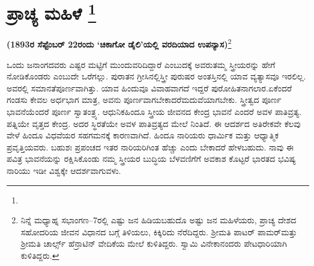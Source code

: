 
\chapter[ಪ್ರಾಚ್ಯ ಮಹಿಳೆ ]{ಪ್ರಾಚ್ಯ ಮಹಿಳೆ \protect\footnote{}}

\centerline{\textbf{(1893ರ ಸೆಪ್ಟೆಂಬರ್​ 22ರಂದು ‘ಚಿಕಾಗೋ ಡೈಲಿ’ಯಲ್ಲಿ ವರದಿಯಾದ ಉಪನ್ಯಾಸ)}\footnote{ ನಿನ್ನೆ ಮಧ್ಯಾಹ್ನ ಸಭಾಂಗಣ–7ರಲ್ಲಿ ಎಷ್ಟು ಜನ ಹಿಡಿಯಬಹುದೊ ಅಷ್ಟು ಜನ ಮಹಿಳೆಯರು, ಪ್ರಾಚ್ಯ ದೇಶದ ಸಹೋದರಿಯ ಜೀವನ ವಿಧಾನದ ಬಗ್ಗೆ ತಿಳಿಯಲು, ಕಿಕ್ಕಿರಿದು ನೆರೆದಿದ್ದರು. ಶ‍್ರೀಮತಿ ಪಾಟರ್​ ಪಾಮರ್​ ಮತ್ತು ಶ‍್ರೀಮತಿ ಚಾರ್ಲ್ಸ್​ ಹೆನ್ರಾಟಿನ್​ ವೇದಿಕೆಯ ಮೇಲೆ ಕುಳಿತಿದ್ದರು. ಸ್ವಾಮಿ ವಿನೇಕಾನಂದರು ಪೇಟಧಾರಿಯಾಗಿ ಕುಳಿತಿದ್ದರು.}}

ಒಂದು ಜನಾಂಗದವರು ಎಷ್ಟರ ಮಟ್ಟಿಗೆ ಮುಂದುವರಿದಿದ್ದಾರೆ ಎಂಬುದಕ್ಕೆ ಅವರು\break ತಮ್ಮ ಸ್ತ್ರೀಯರನ್ನು ಹೇಗೆ ನೋಡಿಕೊಂಡರು ಎಂಬುದೇ ಒರೆಗಲ್ಲು. ಪುರಾತನ ಗ್ರೀಸಿನಲ್ಲಿ\break ಸ್ತ್ರೀ ಪುರುಷರ ಅಂತಸ್ತಿನಲ್ಲಿ ಯಾವ ವ್ಯತ್ಯಾಸವೂ ಇರಲಿಲ್ಲ. ಅವರಲ್ಲಿ ಸಮಾನತೆ\break ಪೂರ್ಣವಾಗಿತ್ತು. ಯಾವ ಹಿಂದುವೂ ವಿವಾಹವಾಗದೆ ಇದ್ದರೆ ಪುರೋಹಿತನಾಗಲಾರ.\break ಏಕೆಂದರೆ ಗಂಡಸು ಕೇವಲ ಅರ್ಧಭಾಗ ಮಾತ್ರ, ಅವನು ಪೂರ್ಣವಾಗಬೇಕಾದರೆ\break ಮದುವೆಯಾಗಬೇಕು. ಸ್ತ್ರೀತ್ವದ ಪೂರ್ಣ ಭಾವನೆಯೆಂದರೆ ಪೂರ್ಣ ಸ್ವಾತಂತ್ರ್ಯ. ಆಧುನಿಕ\break ಹಿಂದೂ ಸ್ತ್ರೀಯ ಜೀವನದ ಕೇಂದ್ರ ಭಾವನೆ ಎಂದರೆ ಅವಳ ಪಾತಿವ್ರತ್ಯ. ಪತ್ನಿಯೇ ವೃತ್ತದ ಕೇಂದ್ರ. ಅದರ ಸ್ಥಿರತೆಯೇ ಅವಳ ಪಾತಿವ್ರತ್ಯದ ಮೇಲೆ ನಿಂತಿದೆ. ಈ ಆದರ್ಶದ ಅತಿರೇಕವೇ ಕೆಲವು ವೇಳೆ ಹಿಂದೂ ವಿಧವೆಯರ ಸಹಗಮನಕ್ಕೆ ಕಾರಣವಾಗಿದೆ. ಹಿಂದೂ ನಾರಿಯರು ಧಾರ್ಮಿಕ ಮತ್ತು ಆಧ್ಯಾತ್ಮಿಕ ಪ್ರವೃತ್ತಿಯವರು. ಬಹುಶಃ ಪ್ರಪಂಚದ ಇತರ ನಾರಿಯರಿಗಿಂತ ಹೆಚ್ಚು ಎಂದು ಬೇಕಾದರೆ ಹೇಳಬಹುದು. ನಾವು ಈ ಪವಿತ್ರ ಭಾವನೆಯನ್ನು ರಕ್ಷಿಸಿಕೊಂಡು ನಮ್ಮ ಸ್ತ್ರೀಯರ ಬುದ್ಧಿಯ ಬೆಳವಣಿಗೆಗೆ ಅವಕಾಶ ಕೊಟ್ಟರೆ ಭಾರತದ ಭವಿಷ್ಯ ನಾರಿಯು ಇಡೀ ವಿಶ್ವಕ್ಕೇ ಆದರ್ಶವಾಗುವಳು.

\vskip 6pt

